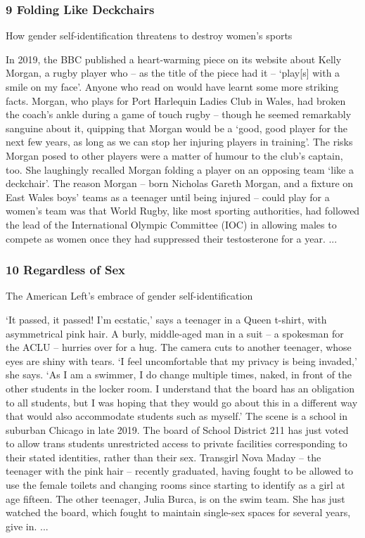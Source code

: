 \documentclass[10pt,titlepage]{book}
\begin{document}
\subsubsection{9 Folding Like Deckchairs}

How gender self-identification threatens to destroy women’s sports

In 2019, the BBC published a heart-warming piece on its website about Kelly Morgan, a rugby player who – as the title of the piece had it – ‘play[s] with a smile on my face’. Anyone who read on would have learnt some more striking facts. Morgan, who plays for Port Harlequin Ladies Club in Wales, had broken the coach’s ankle during a game of touch rugby – though he seemed remarkably sanguine about it, quipping that Morgan would be a ‘good, good player for the next few years, as long as we can stop her injuring players in training’. The risks Morgan posed to other players were a matter of humour to the club’s captain, too. She laughingly recalled Morgan folding a player on an opposing team ‘like a deckchair’. The reason Morgan – born Nicholas Gareth Morgan, and a fixture on East Wales boys’ teams as a teenager until being injured – could play for a women’s team was that World Rugby, like most sporting authorities, had followed the lead of the International Olympic Committee (IOC) in allowing males to compete as women once they had suppressed their testosterone for a year.
...

\subsubsection{10 Regardless of Sex}

The American Left’s embrace of gender self-identification

‘It passed, it passed! I’m ecstatic,’ says a teenager in a Queen t-shirt, with asymmetrical pink hair. A burly, middle-aged man in a suit – a spokesman for the ACLU – hurries over for a hug. The camera cuts to another teenager, whose eyes are shiny with tears. ‘I feel uncomfortable that my privacy is being invaded,’ she says. ‘As I am a swimmer, I do change multiple times, naked, in front of the other students in the locker room. I understand that the board has an obligation to all students, but I was hoping that they would go about this in a different way that would also accommodate students such as myself.’ The scene is a school in suburban Chicago in late 2019. The board of School District 211 has just voted to allow trans students unrestricted access to private facilities corresponding to their stated identities, rather than their sex. Transgirl Nova Maday – the teenager with the pink hair – recently graduated, having fought to be allowed to use the female toilets and changing rooms since starting to identify as a girl at age fifteen. The other teenager, Julia Burca, is on the swim team. She has just watched the board, which fought to maintain single-sex spaces for several years, give in.
...
\end{document}
